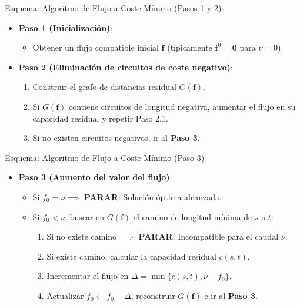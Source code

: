\documentclass[
  ignorenonframetext,
]{beamer}
\providecommand{\tightlist}{%
  \setlength{\itemsep}{0pt}\setlength{\parskip}{0pt}}
\begin{document}
\begin{frame}{Esquema: Algoritmo de Flujo a Coste Mínimo (Pasos 1 y 2)}
\label{esquema-algoritmo-de-flujo-a-coste-muxednimo-pasos-1-y-2}
\begin{itemize}
\tightlist
\item
  \textbf{Paso 1 (Inicialización)}:

  \begin{itemize}
  \tightlist
  \item
    Obtener un flujo compatible inicial \(\mathbf{f}\) (típicamente
    \(\mathbf{f}^0 = \mathbf{0}\) para \(\nu = 0\)).
  \end{itemize}
\item
  \textbf{Paso 2 (Eliminación de circuitos de coste negativo)}:

  \begin{enumerate}
  \tightlist
  \item
    Construir el grafo de distancias residual \(G(\mathbf{f})\).
  \item
    Si \(G(\mathbf{f})\) contiene circuitos de longitud negativa,
    aumentar el flujo en su capacidad residual y repetir Paso 2.1.
  \item
    Si no existen circuitos negativos, ir al \textbf{Paso 3}.
  \end{enumerate}
\end{itemize}
\end{frame}

\begin{frame}{Esquema: Algoritmo de Flujo a Coste Mínimo (Paso 3)}
\label{esquema-algoritmo-de-flujo-a-coste-muxednimo-paso-3}
\begin{itemize}
\tightlist
\item
  \textbf{Paso 3 (Aumento del valor del flujo)}:

  \begin{itemize}
  \tightlist
  \item
    Si \(f_0 = \nu \implies\) \textbf{PARAR}: Solución óptima alcanzada.
  \item
    Si \(f_0 < \nu\), buscar en \(G(\mathbf{f})\) el camino de longitud
    mínima de \(s\) a \(t\):

    \begin{enumerate}
    \tightlist
    \item
      Si no existe camino \(\implies\) \textbf{PARAR}: Incompatible para
      el caudal \(\nu\).
    \item
      Si existe camino, calcular la capacidad residual \(c(s, t)\).
    \item
      Incrementar el flujo en \(\Delta = \min\{c(s, t), \nu - f_0\}\).
    \item
      Actualizar \(f_0 \leftarrow f_0 + \Delta\), reconstruir
      \(G(\mathbf{f})\) e ir al \textbf{Paso 3}.
    \end{enumerate}
  \end{itemize}
\end{itemize}
\end{frame}
\end{document}
